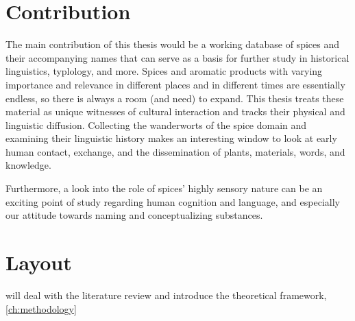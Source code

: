\section{Contribution}

The main contribution of this thesis would be a working database of spices and their accompanying names that can serve as a basis for further study in historical linguistics, typlology, and more. Spices and aromatic products with varying importance and relevance in different places and in different times are essentially endless, so there is always a room (and need) to expand. This thesis treats these material as unique witnesses of cultural interaction and tracks their physical and linguistic diffusion. Collecting the \glspl{wanderwort} of the spice domain and examining their linguistic history makes an interesting window to look at early human contact, exchange, and the dissemination of plants, materials, words, and knowledge.

Furthermore, a look into the role of spices' highly sensory nature can be an exciting point of study regarding human cognition and language, and especially our attitude towards naming and conceptualizing substances.





\section{Layout}

  will deal with the literature review and introduce the theoretical framework, \cref{ch:methodology} 










